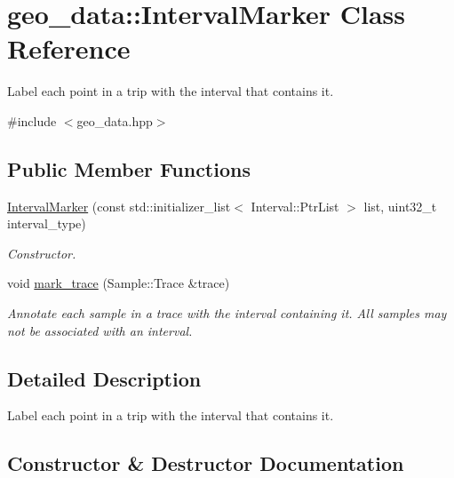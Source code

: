 \hypertarget{classgeo__data_1_1IntervalMarker}{}\section{geo\+\_\+data\+:\+:Interval\+Marker Class Reference}
\label{classgeo__data_1_1IntervalMarker}


Label each point in a trip with the interval that contains it.  




{\ttfamily \#include $<$geo\+\_\+data.\+hpp$>$}

\subsection*{Public Member Functions}
\begin{DoxyCompactItemize}
\item 
\hyperlink{classgeo__data_1_1IntervalMarker_a5c4ea2b6dc213ee5ddab6a203d26969c}{Interval\+Marker} (const std\+::initializer\+\_\+list$<$ Interval\+::\+Ptr\+List $>$ list, uint32\+\_\+t interval\+\_\+type)
\begin{DoxyCompactList}\small\item\em Constructor. \end{DoxyCompactList}\item 
void \hyperlink{classgeo__data_1_1IntervalMarker_afc77457c6d99343996bb5ae64fea6109}{mark\+\_\+trace} (Sample\+::\+Trace \&trace)
\begin{DoxyCompactList}\small\item\em Annotate each sample in a trace with the interval containing it. All samples may not be associated with an interval. \end{DoxyCompactList}\end{DoxyCompactItemize}


\subsection{Detailed Description}
Label each point in a trip with the interval that contains it. 

\subsection{Constructor \& Destructor Documentation}
